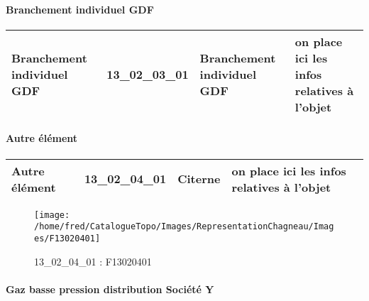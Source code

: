 \documentclass[12pt,titlepage,oneside]{book}
\begin{document}
\paragraph{Branchement individuel GDF}
\noindent
\vspace{\baselineskip}

\renewcommand{\arraystretch}{1.2}
\begin{supertabular}{|p{10cm}|c|p{13cm}|p{12cm}|}
 Branchement individuel GDF & 13\_02\_03\_01 & Branchement individuel GDF & on place ici les infos relatives à l'objet\\
\hline
\end{supertabular}
\begin{figure}[h!]
  \hfill         %
\end{figure}


\paragraph{Autre élément}
\noindent
\vspace{\baselineskip}

\renewcommand{\arraystretch}{1.2}
\begin{supertabular}{|p{10cm}|c|p{13cm}|p{12cm}|}
 Autre élément & 13\_02\_04\_01 & Citerne & on place ici les infos relatives à l'objet\\
\hline
\end{supertabular}
\begin{figure}[h!]
  \hfill         %
  \begin{minipage}[t]{3cm}
    \begin{center}
      \texttt{[image: /home/fred/CatalogueTopo/Images/RepresentationChagneau/Images/F13020401]}
      \caption[F13020401]{\label{} 13\_02\_04\_01 : F13020401}
    \end{center}
  \end{minipage}
\end{figure}


\paragraph{Gaz basse pression distribution Société Y}
\noindent
\vspace{\baselineskip}
\end{document}
